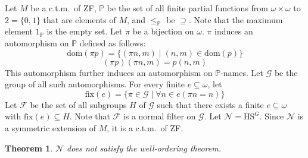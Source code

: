 \documentclass{report}
\newtheorem{thm}{Theorem}[section]
\begin{document}
Let $M$ be a c.t.m.\  of ZF, $\mathbb{P}$ be the set of all finite partial functions from $\omega \times \omega$ to $2 = \{0, 1\}$
that are elements of $M$, and $\leq_{\mathbb{P}}$ be $\supseteq$.
Note that the maximum element $1_{\mathbb{P}}$ is the empty set. 
Let $\pi$ be a bijection on $\omega$. $\pi$ induces an automorphism on $\mathbb{P}$ defined as follows:
$$\mathrm{dom}(\pi p) = \{ (\pi n, m) \mid (n, m) \in \mathrm{dom}(p) \}$$
$$(\pi p)(\pi n, m) = p(n, m)$$
This automorphism further induces an automorphism on $\mathbb{P}$-names. 
Let $\mathcal{G}$ be the group of all such automorphisms.
For every finite $e \subseteq \omega$, let 
$$\mathrm{fix}(e) = \{ \pi \in \mathcal{G} \mid \forall n \in e (\pi n = n) \}$$
Let $\mathcal{F}$ be the set of all subgroups $H$ of $\mathcal{G}$ such that there exists a finite $e \subseteq \omega$ with $\mathrm{fix}(e) \subseteq H$.
Note that $\mathcal{F}$ is a normal filter on $\mathcal{G}$. Let $\mathcal{N} = \mathrm{HS}^{G}$.
Since $\mathcal{N}$ is a symmetric extension of $M$, it is a c.t.m.\  of ZF. 

\begin{thm}
  $\mathcal{N}$ does not satisfy the well-ordering theorem.
\end{thm}
\end{document}
